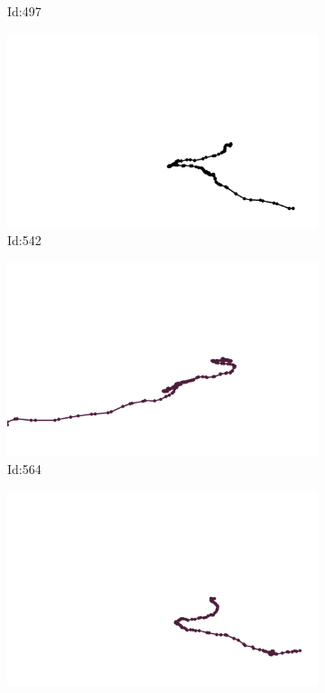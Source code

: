 \documentclass[12pt,twoside]{report}
\begin{document}
\begin{figure}
\begin{subfigure}[b]{0.20\textwidth}
\caption{Id:497}
\end{subfigure}
\begin{subfigure}[b]{0.20\textwidth}
\centering
\includegraphics[width=\textwidth]{../trajectories/542.png}
\caption{Id:542}
\end{subfigure}
\begin{subfigure}[b]{0.20\textwidth}
\centering
\includegraphics[width=\textwidth]{../trajectories/564.png}
\caption{Id:564}
\end{subfigure}
\begin{subfigure}[b]{0.20\textwidth}
\centering
\includegraphics[width=\textwidth]{../trajectories/690.png}

\end{subfigure}
\end{figure}
\end{document}

